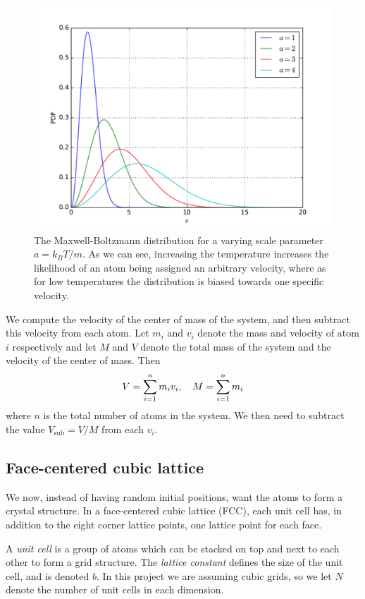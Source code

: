 \documentclass[a4paper]{article}
\begin{document}
    \begin{figure}[h]
        \centering \includegraphics[width=0.7\linewidth]{maxwell_boltzmann.pdf}
        \caption[The Maxwell-Boltzmann distribution]{The Maxwell-Boltzmann
            distribution for a varying scale parameter $a = k_BT/m$.  As we can
            see, increasing the temperature increases the likelihood of an atom
        being assigned an arbitrary velocity, where as for low temperatures the
    distribution is biased towards one specific velocity.}
        \label{fig:maxwell_boltzmann}
    \end{figure}
    We compute the velocity of the center of mass of the system, and then
    subtract this velocity from each atom.  Let $m_i$ and $v_i$ denote the mass
    and velocity of atom $i$ respectively and let $M$ and $V$ denote the total
    mass of the system and the velocity of the center of mass. Then
    \begin{align*}
        \notag
        V = \sum^{n}_{i=1} m_i v_i, \quad M = \sum^{n}_{i=1} m_i
    \end{align*}
    where $n$ is the total number of atoms in the system. We then need to
    subtract the value $V_{\mathrm{sub}} = V / M$ from each $v_i$.

\subsection{Face-centered cubic lattice}
\label{sub:face_centered_cubic_lattice}

    We now, instead of having random initial positions, want the atoms to form
    a crystal structure. In a face-centered cubic lattice (FCC), each unit cell
    has, in addition to the eight corner lattice points, one lattice point for
    each face.

    A \emph{unit cell} is a group of atoms which can be stacked on top and next
    to each other to form a grid structure. The \emph{lattice constant} defines
    the size of the unit cell, and is denoted $b$. In this project we are
    assuming cubic grids, so we let $N$ denote the number of unit cells in each
    dimension.
    
\end{document}
